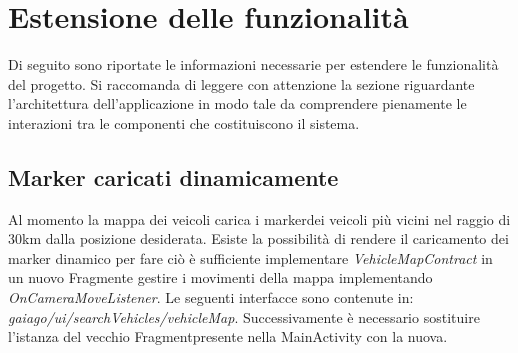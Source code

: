 \section{Estensione delle funzionalità}
Di seguito sono riportate le informazioni necessarie per estendere le funzionalità del progetto. Si raccomanda di leggere con attenzione la sezione riguardante l'architettura dell'applicazione in modo tale da comprendere pienamente le interazioni tra le componenti che costituiscono il sistema.
\subsection{Marker caricati dinamicamente}
Al momento la mappa dei veicoli carica i marker\glosp dei veicoli più vicini nel raggio di 30km dalla posizione desiderata. Esiste la possibilità di rendere il caricamento dei marker dinamico per fare ciò è sufficiente implementare \textit{VehicleMapContract} in un nuovo Fragment\glosp e gestire i movimenti della mappa implementando \textit{OnCameraMoveListener}.
Le seguenti interfacce sono contenute in:
\textit{gaiago/ui/searchVehicles/vehicleMap}.
Successivamente è necessario sostituire l'istanza del vecchio Fragment\glosp presente nella MainActivity con la nuova.